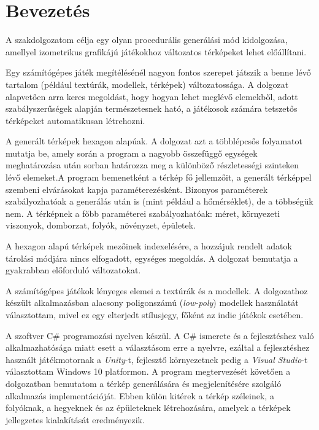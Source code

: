 \chapter*{Bevezetés}

A szakdolgozatom célja egy olyan procedurális generálási mód kidolgozása, amellyel izometrikus grafikájú játékokhoz változatos térképeket lehet előállítani.

Egy számítógépes játék megítélésénél nagyon fontos szerepet játszik a benne lévő tartalom (például textúrák, modellek, térképek) változatossága. A dolgozat alapvetően arra keres megoldást, hogy hogyan lehet meglévő elemekből, adott szabályszerűségek alapján természetesnek ható, a játékosok számára tetszetős térképeket automatikusan létrehozni.

A generált térképek hexagon alapúak. A dolgozat azt a többlépcsős folyamatot mutatja be, amely során a program a nagyobb összefüggő egységek meghatározása után sorban határozza meg a különböző részletességi szinteken lévő elemeket.A program bemenetként a térkép fő jellemzőit, a generált térképpel szembeni elvárásokat kapja paraméterezésként. Bizonyos paraméterek szabályozhatóak a generálás után is (mint például a hőmérséklet), de a többségük nem. A térképnek a főbb paraméterei szabályozhatóak: méret, környezeti viszonyok, domborzat, folyók, növényzet, épületek. 

A hexagon alapú térképek mezőinek indexelésére, a hozzájuk rendelt adatok tárolási módjára nincs elfogadott, egységes megoldás. A dolgozat bemutatja a gyakrabban előforduló változatokat.

A számítógépes játékok lényeges elemei a textúrák és a modellek. A dolgozathoz készült alkalmazásban alacsony poligonszámú (\textit{low-poly}) modellek használatát választottam, mivel ez egy elterjedt stílusjegy, főként az indie játékok esetében.

A szoftver C\# programozási nyelven készül. A C\# ismerete és a fejlesztéshez való alkalmazhatósága miatt esett a választásom erre a nyelvre, ezáltal a fejlesztéshez használt játékmotornak a \textit{Unity}-t, fejlesztő környezetnek pedig a \textit{Visual Studio}-t választottam Windows 10 platformon. A program megtervezését követően a dolgozatban bemutatom a térkép generálására és megjelenítésére szolgáló alkalmazás implementációját. Ebben külön kitérek a térkép széleinek, a folyóknak, a hegyeknek és az épületeknek létrehozására, amelyek a térképek jellegzetes kialakítását eredményezik.
